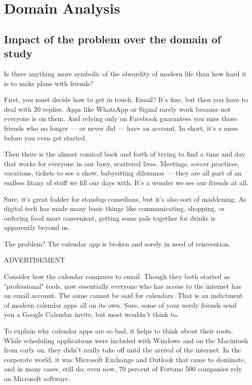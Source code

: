 \section{Domain Analysis}

\graphicspath{ {./Images/} }

\subsection{Impact of the problem over the domain of study}
\par Is there anything more symbolic of the absurdity of modern life than how hard it is to make plans with friends? 

First, you must decide how to get in touch. Email? It's fine, but then you have to deal with 20 replies. Apps like WhatsApp or Signal rarely work because not everyone is on them. And relying only on Facebook guarantees you miss those friends who no longer — or never did — have an account. In short, it's a mess before you even get started. 

Then there is the almost comical back and forth of trying to find a time and day that works for everyone in our busy, scattered lives. Meetings, soccer practices, vacations, tickets to see a show, babysitting dilemmas — they are all part of an endless litany of stuff we fill our days with. It's a wonder we see our friends at all. 

Sure, it's great fodder for standup comedians, but it's also sort of maddening: As digital tech has made many basic things like communicating, shopping, or ordering food more convenient, getting some pals together for drinks is apparently beyond us. 

The problem? The calendar app is broken and sorely in need of reinvention. 

ADVERTISEMENT 

Consider how the calendar compares to email. Though they both started as "professional" tools, now essentially everyone who has access to the internet has an email account. The same cannot be said for calendars. That is an indictment of modern calendar apps all on its own. Sure, some of your nerdy friends send you a Google Calendar invite, but most wouldn't think to. 

To explain why calendar apps are so bad, it helps to think about their roots. While scheduling applications were included with Windows and on the Macintosh from early on, they didn't really take off until the arrival of the internet. In the corporate world, it was Microsoft Exchange and Outlook that came to dominate, and in many cases, still do; even now, 70 percent of Fortune 500 companies rely on Microsoft software. 

